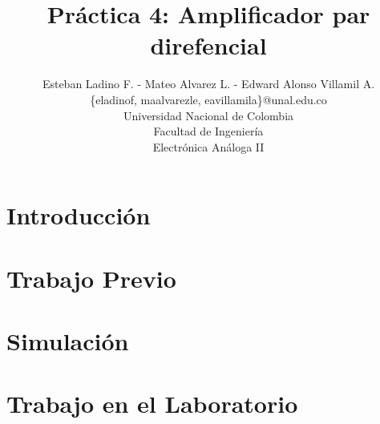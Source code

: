 \documentclass[twocolumns,12pt]{IEEEtran}
\begin{document}
\renewcommand{\tablename}{\small{\textsc{Tabla}}}

\title{Práctica 4: Amplificador par direfencial}
\author{Esteban Ladino F. - Mateo Alvarez L. - Edward Alonso Villamil A.\\ 
\{eladinof, maalvarezle, eavillamila\}@unal.edu.co\\ Universidad Nacional de Colombia\\
Facultad de Ingeniería\\
Electrónica Análoga II}
\maketitle


\renewcommand{\leftmark}{Práctica 4: Amplificador par direfencial., E. Ladino, M. Alvarez y E. Villamil, noviembre 17 del 2019}  

\maketitle


\begin{abstract}

\end{abstract}

\renewcommand{\abstractname}{Resumen}
\begin{abstract}

\end{abstract}

\renewcommand{\IEEEkeywordsname}{Palabras Clave}
\begin{IEEEkeywords} 

\end{IEEEkeywords}

\IEEEpeerreviewmaketitle

\section{Introducción}

\section{Trabajo Previo}

\section{Simulación}

\section{Trabajo en el Laboratorio}
\end{document}
